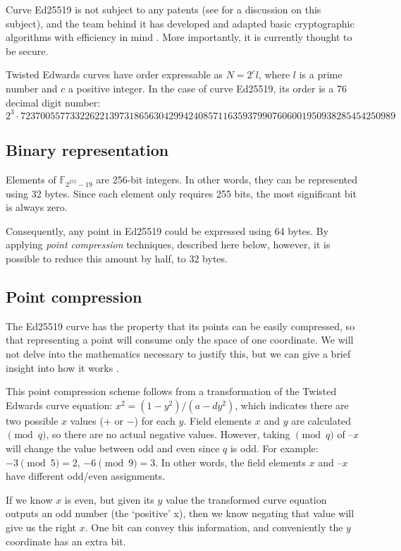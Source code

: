 Curve Ed25519 is not subject to any patents (see \cite{ECC-patents} for a discussion on this subject), and the team behind it has
developed and adapted basic cryptographic algorithms with efficiency in mind \cite{cryptoeprint:2007:286}. More importantly, it is currently thought to be secure.

Twisted Edwards curves have order expressable as \(N=2^c l\), where \(l\) is a prime number and \(c\) a positive integer. In the case of curve Ed25519, its order is a 76 decimal digit number:
\[2^3 \cdot 7237005577332262213973186563042994240857116359379907606001950938285454250989\]


\subsection{Binary representation}
\label{binary_note}
Elements of \(\mathbb{F}_{2^{255} - 19} \) are 256-bit integers. In other words, they can be represented using 32 bytes. Since each element only requires 255 bits, the most significant bit is always zero.

Consequently, any point in Ed25519 could be expressed using 64 bytes.
By applying {\em point compression} techniques, described here below, however, it is possible to reduce this amount by half, to 32 bytes.

\subsection{Point compression}
\label{point_compression_section}

The Ed25519 curve has the property that its points can be easily compressed, so that representing a point will consume only the space of one coordinate. We will not delve into the mathematics necessary to justify this, but we can give a brief insight into how it works \cite{Bernstein2012}.

This point compression scheme follows from a transformation of the Twisted Edwards curve equation: $x^2 = (1-y^2)/(a-d y^2)$, which indicates there are two possible $x$ values ($+$ or $-$) for each $y$. Field elements $x$ and $y$ are calculated $\pmod{q}$, so there are no actual negative values. However, taking $\pmod{q}$ of $–x$ will change the value between odd and even since $q$ is odd. For example: $-3 \pmod{5} = 2$, $-6 \pmod{9} = 3$. In other words, the field elements $x$ and $–x$ have different odd/even assignments.

If we know $x$ is even, but given its $y$ value the transformed curve equation outputs an odd number (the `positive' x), then we know negating that value will give us the right $x$. One bit can convey this information, and conveniently the $y$ coordinate has an extra bit.

